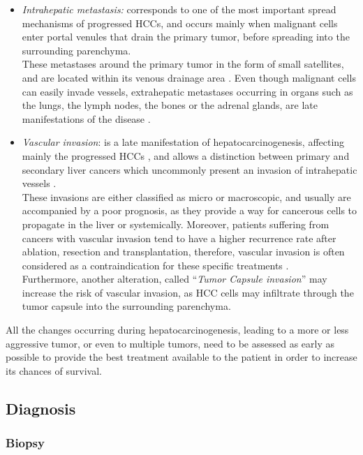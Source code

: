 \begin{itemize}
\item \emph{Intrahepatic metastasis:} corresponds to one of the most
  important spread mechanisms of progressed HCCs, and occurs
  mainly when malignant cells enter portal venules that drain the
  primary tumor, before spreading into the surrounding parenchyma.\\
  These metastases around the primary tumor in the form of small
  satellites, and are located within its venous drainage area \cite{Nakashima2003}. Even though malignant cells can
  easily invade vessels, extrahepatic metastases occurring in organs
  such as the lungs, the lymph nodes, the bones or the adrenal glands,
  are late manifestations of the disease \cite{Theise2006, Trevisani2008a}.
\item \emph{Vascular invasion}: is a late manifestation of
  hepatocarcinogenesis, affecting mainly the progressed HCCs
  \cite{EdmondsonHA1954}, and allows a distinction between
  primary and secondary liver cancers which uncommonly present an
  invasion of intrahepatic vessels \cite{Okuda1997}.\\
  These invasions are either classified as micro or macroscopic, and
  usually are accompanied by a poor prognosis, as they provide a way for
  cancerous cells to propagate in the liver or systemically. Moreover,
  patients suffering from cancers with vascular invasion tend to have a
  higher recurrence rate after ablation, resection and transplantation,
  therefore, vascular invasion is often considered as a contraindication
  for these specific treatments \cite{Llovet2004}.\\
  Furthermore, another alteration, called ``\emph{Tumor Capsule
  invasion}'' may increase the risk of vascular invasion, as HCC
  cells may infiltrate through the tumor capsule into the surrounding
  parenchyma.
\end{itemize}

All the changes occurring during hepatocarcinogenesis, leading to a more
or less aggressive tumor, or even to multiple tumors, need to be
assessed as early as possible to provide the best treatment available to
the patient in order to increase its chances of survival.

\subsection{Diagnosis}\label{diagnosis}

\subsubsection{Biopsy}\label{biopsy}


